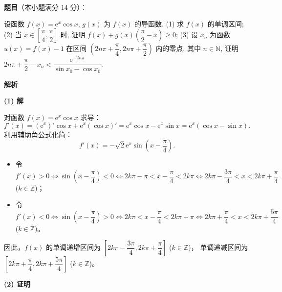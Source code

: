 \begin{answer}

\textbf{题目}（本小题满分 14 分）：

设函数 $f(x) = \mathrm{e}^x \cos x$, $g(x)$ 为 $f(x)$ 的导函数.
(1) 求 $f(x)$ 的单调区间;
(2) 当 $x \in \left[\dfrac{\pi}{4}, \dfrac{\pi}{2}\right]$ 时, 证明 $f(x) + g(x)\left(\dfrac{\pi}{2} - x\right) \geqslant 0$;
(3) 设 $x_n$ 为函数 $u(x) = f(x) - 1$ 在区间 $\left(2n\pi + \dfrac{\pi}{4}, 2n\pi + \dfrac{\pi}{2}\right)$ 内的零点, 其中 $n \in \mathbb{N}$, 证明 $2n\pi + \dfrac{\pi}{2} - x_n < \dfrac{\mathrm{e}^{-2n\pi}}{\sin x_0 - \cos x_0}$.

\textbf{解析}

\textbf{(1) 解}

对函数 $f(x) = \mathrm{e}^x \cos x$ 求导：
\nopagebreak[4]
\[f'(x) = (\mathrm{e}^x)' \cos x + \mathrm{e}^x (\cos x)' = \mathrm{e}^x \cos x - \mathrm{e}^x \sin x = \mathrm{e}^x (\cos x - \sin x).\]
利用辅助角公式化简：
\nopagebreak[4]
\[f'(x) = -\sqrt{2} \mathrm{e}^x \sin\left(x - \frac{\pi}{4}\right).\]
\begin{itemize}
\item 令 $f'(x) > 0 \iff \sin\left(x - \dfrac{\pi}{4}\right) < 0 \iff 2k\pi - \pi < x - \dfrac{\pi}{4} < 2k\pi \iff 2k\pi - \dfrac{3\pi}{4} < x < 2k\pi + \dfrac{\pi}{4}$ ($k \in \mathbb{Z}$)；
\item 令 $f'(x) < 0 \iff \sin\left(x - \dfrac{\pi}{4}\right) > 0 \iff 2k\pi < x - \dfrac{\pi}{4} < 2k\pi + \pi \iff 2k\pi + \dfrac{\pi}{4} < x < 2k\pi + \dfrac{5\pi}{4}$ ($k \in \mathbb{Z}$)。
\end{itemize}
因此，$f(x)$ 的单调递增区间为 $\left[2k\pi - \dfrac{3\pi}{4}, 2k\pi + \dfrac{\pi}{4}\right]$ ($k \in \mathbb{Z}$)，
单调递减区间为 $\left[2k\pi + \dfrac{\pi}{4}, 2k\pi + \dfrac{5\pi}{4}\right]$ ($k \in \mathbb{Z}$)。

\textbf{(2) 证明}


\end{answer}
